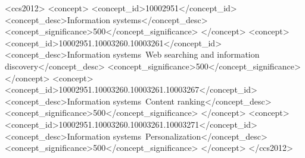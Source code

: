 \documentclass[sigconf]{acmart}
\begin{document}
\author{Saurabh Vishwas Joshi}

\author{Nazanin Farahpour}


\author{Zhiyuan Zhang}

\author{Andrew Zhai}


\renewcommand{\shortauthors}{Xia et~al.}






\begin{CCSXML}
<ccs2012>
   <concept>
       <concept_id>10002951</concept_id>
       <concept_desc>Information systems</concept_desc>
       <concept_significance>500</concept_significance>
       </concept>
   <concept>
       <concept_id>10002951.10003260.10003261</concept_id>
       <concept_desc>Information systems~Web searching and information discovery</concept_desc>
       <concept_significance>500</concept_significance>
       </concept>
   <concept>
       <concept_id>10002951.10003260.10003261.10003267</concept_id>
       <concept_desc>Information systems~Content ranking</concept_desc>
       <concept_significance>500</concept_significance>
       </concept>
   <concept>
       <concept_id>10002951.10003260.10003261.10003271</concept_id>
       <concept_desc>Information systems~Personalization</concept_desc>
       <concept_significance>500</concept_significance>
       </concept>
 </ccs2012>
\end{CCSXML}
\end{document}
